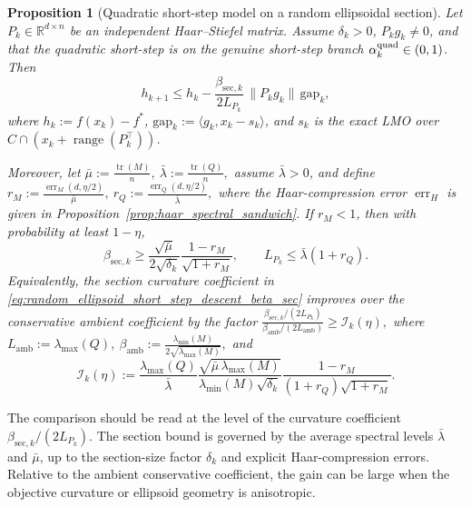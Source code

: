 \documentclass{article}
\newtheorem{proposition}{Proposition}
\begin{document}
\begin{proposition}[Quadratic short-step model on a random ellipsoidal section]
\label{prop:random_ellipsoid_short_step_improvement}
Let \(P_k\in\mathbb R^{d\times n}\) be an independent Haar--Stiefel matrix.
Assume \(\delta_k>0\), \(P_kg_k\neq0\), and that the quadratic short-step is on
the genuine short-step branch \(\alpha_k^{\rm quad}\in(0,1)\). Then
\begin{equation}
h_{k+1}
\le
h_k
-
\frac{\beta_{\mathrm{sec},k}}{2L_{P_k}}
\,\|P_kg_k\|\,\mathrm{gap}_k,
\label{eq:random_ellipsoid_short_step_descent_beta_sec}
\end{equation}
where \(h_k:=f(x_k)-f^*\),
\(\mathrm{gap}_k:=\langle g_k,x_k-s_k\rangle\), and \(s_k\) is the exact LMO
over \(C\cap(x_k+\operatorname{range}(P_k^\top))\).

Moreover, let
$
\bar\mu:=\frac{\operatorname{tr}(M)}{n},
\ 
\bar\lambda:=\frac{\operatorname{tr}(Q)}{n},
$
assume $\bar \lambda>0$, and define
$
r_M:=\frac{\operatorname{err}_M(d,\eta/2)}{\bar\mu},\ 
r_Q:=\frac{\operatorname{err}_Q(d,\eta/2)}{\bar\lambda},
$
where the Haar-compression error \(\operatorname{err}_H\) is given in
Proposition~\ref{prop:haar_spectral_sandwich}. If \(r_M<1\), then with
probability at least \(1-\eta\),
\begin{equation}
\beta_{\mathrm{sec},k}
\ge
\frac{\sqrt{\bar\mu}}{2\sqrt{\delta_k}}
\frac{1-r_M}{\sqrt{1+r_M}},
\qquad
L_{P_k}\le \bar\lambda(1+r_Q).
\label{eq:beta_sec_and_LP_random_bounds}
\end{equation}
Equivalently, the section curvature coefficient in
\eqref{eq:random_ellipsoid_short_step_descent_beta_sec} improves over the
conservative ambient coefficient by the factor
$
\frac{\beta_{\mathrm{sec},k}/(2L_{P_k})}
     {\beta_{\mathrm{amb}}/(2L_{\mathrm{amb}})}
\ge
\mathcal I_k(\eta),$
where
$
L_{\mathrm{amb}}:=\lambda_{\max}(Q),
\ 
\beta_{\mathrm{amb}}
:=
\frac{\lambda_{\min}(M)}{2\sqrt{\lambda_{\max}(M)}},
$
and
\begin{equation}
\mathcal I_k(\eta)
:=
\frac{\lambda_{\max}(Q)}{\bar\lambda}
\frac{\sqrt{\bar\mu\,\lambda_{\max}(M)}}
     {\lambda_{\min}(M)\sqrt{\delta_k}}
\frac{1-r_M}{(1+r_Q)\sqrt{1+r_M}}.
\label{eq:Ik_eta}
\end{equation}
\end{proposition}
The comparison should be read at the level of the curvature coefficient
\(\beta_{\mathrm{sec},k}/(2L_{P_k})\). The section bound is governed by the
average spectral levels \(\bar\lambda\) and \(\bar\mu\), up to the section-size
factor \(\delta_k\) and explicit Haar-compression errors. Relative to the
ambient conservative coefficient, the gain can be large when the objective
curvature or ellipsoid geometry is anisotropic.
\end{document}
